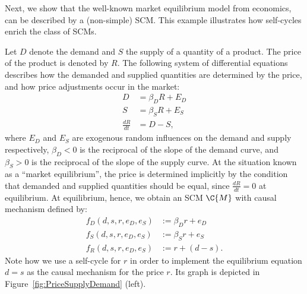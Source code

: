 Next, we show that the well-known market equilibrium model from economics, can be described by a (non-simple) SCM. 
This example illustrates how self-cycles enrich the class of SCMs.
\begin{Eg}
  \label{ex:PriceSupplyDemandDynamical}
Let $D$ denote the demand and $S$ the supply of a quantity of a product. The
price of the product is denoted by $R$. The following system of differential equations describes how the
demanded and supplied quantities are determined by the price, and how price
adjustments occur in the market:
$$
  \begin{aligned}
    D &= \beta_D R + E_D \\
    S &= \beta_S R + E_S \\
    \frac{dR}{dt} &= D - S,
  \end{aligned}
$$
where $E_D$ and $E_S$ are exogenous random influences on the demand and supply respectively, $\beta_D<0$ is the reciprocal of the slope of the demand curve, and $\beta_S>0$ is the reciprocal of the slope of the supply curve. At the situation known as a ``market equilibrium'', the price is determined implicitly by the condition that demanded and supplied quantities should be equal, since $\frac{dR}{dt}=0$ at equilibrium. 
At equilibrium, hence, we obtain an SCM $\C{M}$ with causal mechanism defined by:
$$
  \begin{aligned}
    f_D(d,s,r,e_D,e_S) &:= \beta_D r + e_D \\
    f_S(d,s,r,e_D,e_S) &:= \beta_S r + e_S \\
    f_R(d,s,r,e_D,e_S) &:= r + (d - s).
  \end{aligned}
$$
Note how we use a self-cycle for $r$ in order to implement the equilibrium
equation $d = s$ as the causal mechanism for the price $r$. 
Its graph is depicted in Figure~\ref{fig:PriceSupplyDemand} (left).
\begin{figure}\centering

\end{figure}
\end{Eg}
